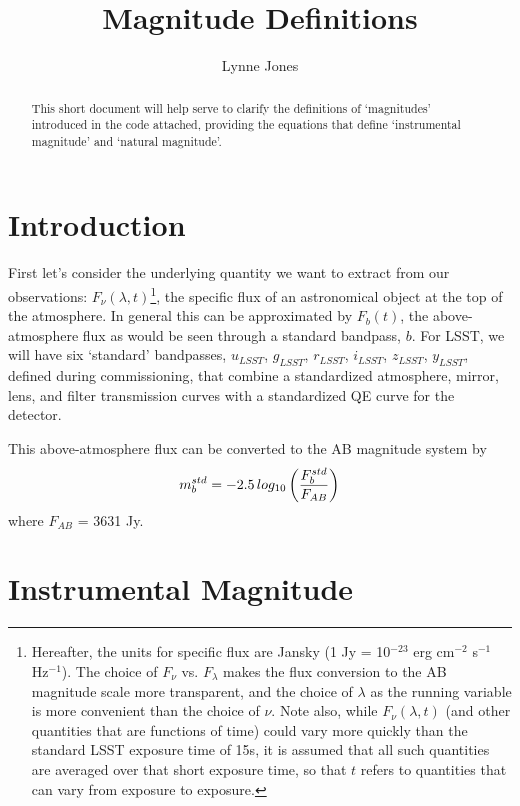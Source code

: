 \documentclass[12pt,preprint]{aastex}
\newcommand{\lsst}   {_{LSST}}
\begin{document}
\title{Magnitude Definitions}
\author{Lynne Jones}

\begin{abstract}
This short document will help serve to clarify the definitions of `magnitudes' 
introduced in the code attached, providing the equations that define `instrumental magnitude' 
and `natural magnitude'. 
\end{abstract}

\section{Introduction}

First let's consider the underlying quantity we want to extract from our observations: 
$F_\nu(\lambda, t)$\footnote{Hereafter, the units for specific
flux are Jansky (1 Jy = 10$^{-23}$ erg cm$^{-2}$ s$^{-1}$
Hz$^{-1}$). The choice of $F_\nu$ vs. $F_\lambda$ makes the flux
conversion to the AB magnitude scale more transparent, and the choice
of $\lambda$ as the running variable is more convenient than the
choice of $\nu$. Note also, while $F_\nu(\lambda,t)$ (and other
quantities that are functions of time) could vary more quickly than
the standard LSST exposure time of 15s, it is assumed that all such
quantities are averaged over that short exposure time, so that $t$
refers to quantities that can vary from exposure to exposure. }, the specific flux of an 
astronomical object at the top of the atmosphere. In general this can be 
approximated by $F_b(t)$, the above-atmosphere flux as would be seen through a
standard bandpass, $b$. For LSST, we will have six `standard' bandpasses, $u\lsst$,
$g\lsst$, $r\lsst$, $i\lsst$, $z\lsst$, $y\lsst$, defined during commissioning, that combine
a standardized atmosphere, mirror, lens, and filter transmission curves with a standardized QE
curve for the detector. 

This above-atmosphere flux can be converted to the AB magnitude system by
\begin{equation}
m_b^{std} = -2.5 \, log_{10}  \left( {F_b^{std} \over F_{AB}}  \right)
\end{equation}
where $F_{AB}$ = 3631 Jy.


\section{Instrumental Magnitude}
\end{document}
